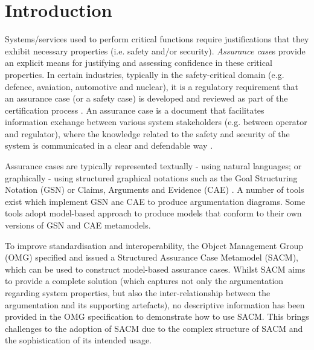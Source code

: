 \section{Introduction}
Systems/services used to perform critical functions require justifications that they exhibit necessary properties (i.e. safety and/or security). \textit{Assurance case}s provide an explicit means for justifying and assessing confidence in these critical properties. In certain industries, typically in the safety-critical domain (e.g. defence, avaiation, automotive and nuclear), it is a regulatory requirement that an assurance case (or a safety case) is developed and reviewed as part of the certification process \cite{healthFound}.
An assurance case is a document that facilitates information exchange between various system stakeholders (e.g. between operator and regulator), where the knowledge related to the safety and security of the system is communicated in a clear and defendable way \cite{hawkins2013assurance}. 

Assurance cases are typically represented textually - using natural languages; or graphically - using structured graphical notations such as the Goal Structuring Notation (GSN) \cite{kelly2004goal} or Claims, Arguments and Evidence (CAE) \cite{cae}. A number of tools exist which implement GSN anc CAE to produce argumentation diagrams. Some tools adopt model-based approach to produce models that conform to their own versions of GSN and CAE metamodels. 


To improve standardisation and interoperability, the Object Management Group (OMG) specified and issued a Structured Assurance Case Metamodel (SACM), which can be used to construct model-based assurance cases. 
Whilst SACM aims to provide a complete solution (which captures not only the argumentation regarding system properties, but also the inter-relationship between the argumentation and its supporting artefacts), no descriptive information has been provided in the OMG specification to demonstrate how to use SACM. This brings challenges to the adoption of SACM due to the complex structure of SACM and the sophistication of its intended usage. 

